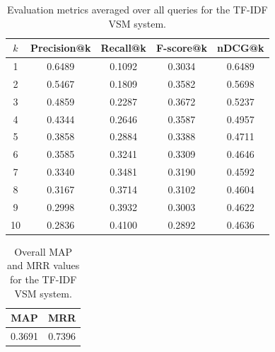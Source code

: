 \begin{table}[H]
\centering
\caption{Evaluation metrics averaged over all queries for the TF-IDF VSM system.}
\label{tab:vsm_metrics}
\begin{tabular}{|c|c|c|c|c|}
\hline
$k$ & Precision@k & Recall@k & F-score@k & nDCG@k \\
\hline
1 & 0.6489 & 0.1092 & 0.3034 & 0.6489 \\
2 & 0.5467 & 0.1809 & 0.3582 & 0.5698 \\
3 & 0.4859 & 0.2287 & 0.3672 & 0.5237 \\
4 & 0.4344 & 0.2646 & 0.3587 & 0.4957 \\
5 & 0.3858 & 0.2884 & 0.3388 & 0.4711 \\
6 & 0.3585 & 0.3241 & 0.3309 & 0.4646 \\
7 & 0.3340 & 0.3481 & 0.3190 & 0.4592 \\
8 & 0.3167 & 0.3714 & 0.3102 & 0.4604 \\
9 & 0.2998 & 0.3932 & 0.3003 & 0.4622 \\
10 & 0.2836 & 0.4100 & 0.2892 & 0.4636 \\
\hline
\end{tabular}
\end{table}

\begin{table}[H]
\centering
\caption{Overall MAP and MRR values for the TF-IDF VSM system.}
\label{tab:vsm_map_mrr}
\begin{tabular}{|c|c|}
\hline
MAP & MRR \\
\hline
0.3691 & 0.7396 \\
\hline
\end{tabular}
\end{table}